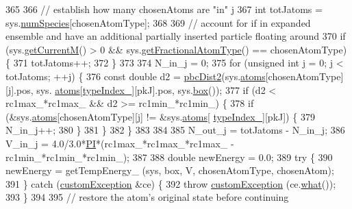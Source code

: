 \begin{DoxyCode}
365 
366         \textcolor{comment}{// establish how many chosenAtoms are "in" j}
367         \textcolor{keywordtype}{int} totJatoms = sys.\hyperlink{classsim_system_a9eea865e6dc1cff377b1e79c4d9c23f0}{numSpecies}[chosenAtomType];
368 
369             \textcolor{comment}{// account for if in expanded ensemble and have an additional partially inserted particle
       floating around}
370             \textcolor{keywordflow}{if} (sys.\hyperlink{classsim_system_a299fe4372e610b554eaaf5f5957b2dbc}{getCurrentM}() > 0 && sys.\hyperlink{classsim_system_a0500a9e84eecfbde7a98cf8a34f719d5}{getFractionalAtomType}() == 
      chosenAtomType) \{
371                 totJatoms++;
372             \}
373 
374         N\_in\_j = 0;
375             \textcolor{keywordflow}{for} (\textcolor{keywordtype}{unsigned} \textcolor{keywordtype}{int} j = 0; j < totJatoms; ++j) \{
376                 \textcolor{keyword}{const} \textcolor{keywordtype}{double} d2 = \hyperlink{utilities_8cpp_abb1db3a8a3ac46e044bbe7b2c5684c0a}{pbcDist2}(sys.\hyperlink{classsim_system_a90421b19082f7fb8fc23b7264b1161e4}{atoms}[chosenAtomType][j].pos, sys.
      \hyperlink{classsim_system_a90421b19082f7fb8fc23b7264b1161e4}{atoms}[\hyperlink{classmc_move_acb731965547b0326ef318ec96da8b46a}{typeIndex\_}][pkJ].pos, sys.\hyperlink{classsim_system_a8bff9dfb95b1b09a0fab2c1c485ade07}{box}());
377             \textcolor{keywordflow}{if} (d2 < rc1max\_*rc1max\_ && d2 >= rc1min\_*rc1min\_) \{
378                             \textcolor{keywordflow}{if} (&sys.\hyperlink{classsim_system_a90421b19082f7fb8fc23b7264b1161e4}{atoms}[chosenAtomType][j] != &sys.\hyperlink{classsim_system_a90421b19082f7fb8fc23b7264b1161e4}{atoms}[
      \hyperlink{classmc_move_acb731965547b0326ef318ec96da8b46a}{typeIndex\_}][pkJ]) \{
379                     N\_in\_j++;
380                 \}
381             \}
382         \}
383 
384 
385         N\_out\_j = totJatoms - N\_in\_j;
386         V\_in\_j = 4.0/3.0*\hyperlink{global_8h_a598a3330b3c21701223ee0ca14316eca}{PI}*(rc1max\_*rc1max\_*rc1max\_ - rc1min\_*rc1min\_*rc1min\_);
387 
388             \textcolor{keywordtype}{double} newEnergy = 0.0;
389             \textcolor{keywordflow}{try} \{
390                 newEnergy = getTempEnergy\_ (sys, box, V, chosenAtomType, chosenAtom);
391             \} \textcolor{keywordflow}{catch} (\hyperlink{classcustom_exception}{customException} &ce) \{
392                 \textcolor{keywordflow}{throw} \hyperlink{classcustom_exception}{customException} (ce.\hyperlink{classcustom_exception_aeb6ab5848b038adfc68fde86a512f691}{what}());
393             \}
394 
395             \textcolor{comment}{// restore the atom's original state before continuing}

\end{DoxyCode}
